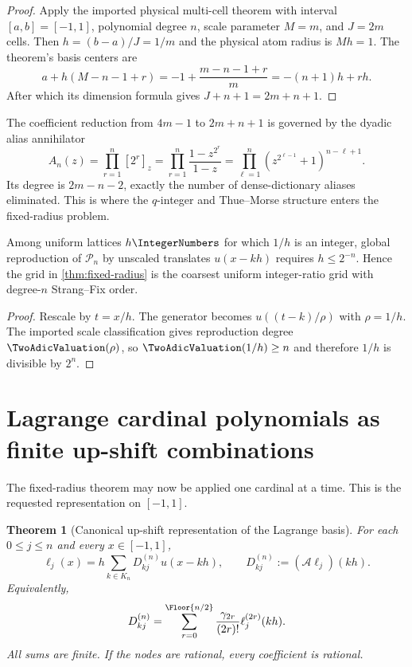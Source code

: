 \documentclass[11pt,oneside]{article}
\numberwithin{equation}{section}
\newtheorem{theorem}{Theorem}[section]
\theoremstyle{definition}
\theoremstyle{remark}
\newcommand{\PiN}{\mathcal P}
\newcommand{\App}{\mathscr A}
\begin{document}
\begin{proof}
Apply the imported physical multi-cell theorem with interval $[a,b]=[-1,1]$,
polynomial degree $n$, scale parameter $M=m$, and $J=2m$ cells.  Then
$h=(b-a)/J=1/m$ and the physical atom radius is $Mh=1$.  The theorem's basis
centers are
\[
 a+h(M-n-1+r)=-1+\frac{m-n-1+r}{m}=-(n+1)h+rh.
\]
After which its dimension formula gives $J+n+1=2m+n+1$.
\end{proof}

The coefficient reduction from $4m-1$ to $2m+n+1$ is governed by the dyadic
alias annihilator
\begin{equation}
 A_n(z)=\prod_{r=1}^{n}[2^r]_z
 =\prod_{r=1}^{n}\frac{1-z^{2^r}}{1-z}
 =\prod_{\ell=1}^{n}(z^{2^{\ell-1}}+1)^{n-\ell+1}.
 \label{eq:annihilator}
\end{equation}
Its degree is $2m-n-2$, exactly the number of dense-dictionary aliases
eliminated.  This is where the $q$-integer and Thue--Morse structure enters
the fixed-radius problem.

\begin{proposition}
\label{prop:lattice-optimal}
Among uniform lattices $h\IntegerNumbers$ for which $1/h$ is an integer, global
reproduction of $\PiN_n$ by unscaled translates $u(x-kh)$ requires
$h\le2^{-n}$.  Hence the grid in \cref{thm:fixed-radius} is the coarsest
uniform integer-ratio grid with degree-$n$ Strang--Fix order.
\end{proposition}

\begin{proof}
Rescale by $t=x/h$.  The generator becomes $u((t-k)/\rho)$ with
$\rho=1/h$.  The imported scale classification gives reproduction degree
$\TwoAdicValuation(\rho)$, so $\TwoAdicValuation(1/h)\ge n$ and therefore $1/h$ is divisible by
$2^n$.
\end{proof}

\section{Lagrange cardinal polynomials as finite up-shift combinations}
\label{sec:lagrange-synthesis}

The fixed-radius theorem may now be applied one cardinal at a time.  This is
the requested representation on $[-1,1]$.

\begin{theorem}[Canonical up-shift representation of the Lagrange basis]
\label{thm:lagrange-up}
For each $0\le j\le n$ and every $x\in[-1,1]$,
\begin{equation}
 \boxed{
 \ell_j(x)=h\sum_{k\in K_n}D_{kj}^{(n)}u(x-kh),
 \qquad
 D_{kj}^{(n)}:=(\App\ell_j)(kh).
 }
 \label{eq:lagrange-up}
\end{equation}
Equivalently,
\begin{equation}
 D_{kj}^{(n)}
 =\sum_{r=0}^{\Floor{n/2}}
   \frac{\gamma_{2r}}{(2r)!}\ell_j^{(2r)}(kh).
 \label{eq:D-derivative}
\end{equation}
All sums are finite.  If the nodes are rational, every coefficient is
rational.
\end{theorem}
\end{document}
